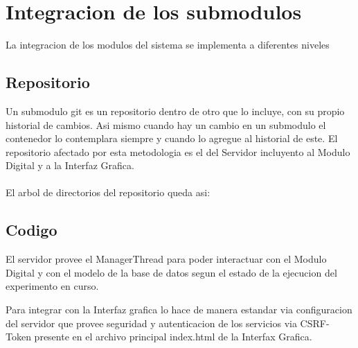 \section{Integracion de los submodulos}

La integracion de los modulos del sistema se implementa a diferentes niveles

\subsection{Repositorio}

Un submodulo git es un repositorio dentro de otro que lo incluye, con su propio historial de cambios. Asi mismo cuando hay un cambio en un submodulo el contenedor lo contemplara siempre y cuando lo agregue al historial de este.
El repositorio afectado por esta metodologia es el del Servidor incluyento al Modulo Digital y a la Interfaz Grafica.
\\
\\
El arbol de directorios del repositorio queda asi:


\subsection{Codigo}

El servidor provee el ManagerThread para poder interactuar con el Modulo Digital y con el 
modelo de la base de datos segun el estado de la ejecucion del experimento en curso.

Para integrar con la Interfaz grafica lo hace de manera estandar via configuracion del servidor
que provee seguridad y autenticacion de los servicios via CSRF-Token presente en el archivo
principal index.html de la Interfax Grafica.
\newpage


